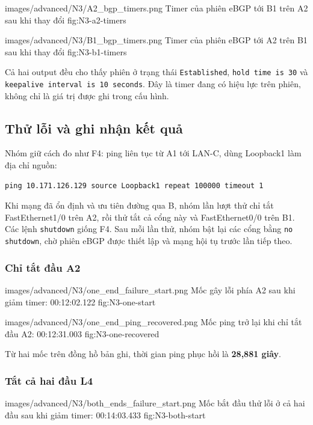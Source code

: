 \partzeroimage
{images/advanced/N3/A2_bgp_timers.png}
{Timer của phiên eBGP tới B1 trên A2 sau khi thay đổi}
{fig:N3-a2-timers}

\partzeroimage
{images/advanced/N3/B1_bgp_timers.png}
{Timer của phiên eBGP tới A2 trên B1 sau khi thay đổi}
{fig:N3-b1-timers}

Cả hai output đều cho thấy phiên ở trạng thái
\texttt{Established}, \texttt{hold time is 30}
và \texttt{keepalive interval is 10 seconds}.
Đây là timer đang có hiệu lực trên phiên,
không chỉ là giá trị được ghi trong cấu hình.

\subsection{Thử lỗi và ghi nhận kết quả}

Nhóm giữ cách đo như F4:
ping liên tục từ A1 tới LAN-C,
dùng Loopback1 làm địa chỉ nguồn:

\begin{lstlisting}
ping 10.171.126.129 source Loopback1 repeat 100000 timeout 1
\end{lstlisting}

Khi mạng đã ổn định và ưu tiên đường qua B,
nhóm lần lượt thử chỉ tắt FastEthernet1/0
trên A2, rồi thử tắt cả cổng này và
FastEthernet0/0 trên B1.
Các lệnh \texttt{shutdown} giống F4.
Sau mỗi lần thử, nhóm bật lại các cổng
bằng \texttt{no shutdown}, chờ phiên eBGP
được thiết lập và mạng hội tụ trước lần tiếp theo.

\subsubsection{Chỉ tắt đầu A2}

\partzeroimage
{images/advanced/N3/one_end_failure_start.png}
{Mốc gây lỗi phía A2 sau khi giảm timer: 00:12:02.122}
{fig:N3-one-start}

\partzeroimage
{images/advanced/N3/one_end_ping_recovered.png}
{Mốc ping trở lại khi chỉ tắt đầu A2: 00:12:31.003}
{fig:N3-one-recovered}

Từ hai mốc trên đồng hồ bản ghi,
thời gian ping phục hồi là
\textbf{28,881 giây}.

\subsubsection{Tắt cả hai đầu L4}

\partzeroimage
{images/advanced/N3/both_ends_failure_start.png}
{Mốc bắt đầu thử lỗi ở cả hai đầu sau khi giảm timer: 00:14:03.433}
{fig:N3-both-start}

